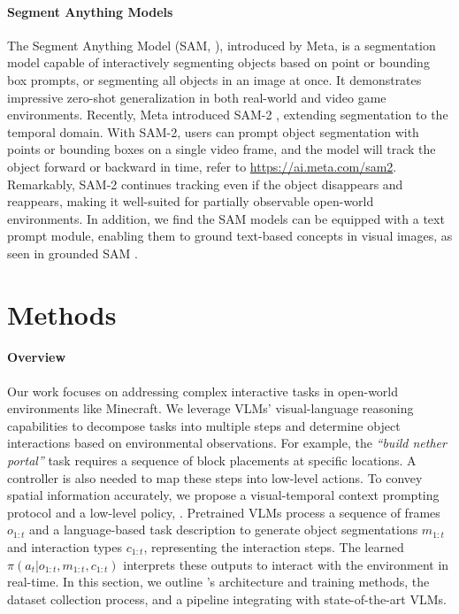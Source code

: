 \paragraph{Segment Anything Models} 
The Segment Anything Model (SAM, \cite{sam}), introduced by Meta, is a segmentation model capable of interactively segmenting objects based on point or bounding box prompts, or segmenting all objects in an image at once. It demonstrates impressive zero-shot generalization in both real-world and video game environments. Recently, Meta introduced SAM-2 \citep{sam2}, extending segmentation to the temporal domain. With SAM-2, users can prompt object segmentation with points or bounding boxes on a single video frame, and the model will track the object forward or backward in time, refer to \url{https://ai.meta.com/sam2}. Remarkably, SAM-2 continues tracking even if the object disappears and reappears, making it well-suited for partially observable open-world environments. In addition, we find the SAM models can be equipped with a text prompt module, enabling them to ground text-based concepts in visual images, as seen in grounded SAM \citep{liu2023grounding}. 



\section{Methods}
\label{sec:method}

\paragraph{Overview} Our work focuses on addressing complex interactive tasks in open-world environments like Minecraft. We leverage VLMs’ visual-language reasoning capabilities to decompose tasks into multiple steps and determine object interactions based on environmental observations. For example, the \textit{``build nether portal''} task requires a sequence of block placements at specific locations. A controller is also needed to map these steps into low-level actions. To convey spatial information accurately, we propose a visual-temporal context prompting protocol and a low-level policy, \agent. Pretrained VLMs process a sequence of frames $o_{1:t}$  and a language-based task description to generate object segmentations $m_{1:t}$  and interaction types $c_{1:t}$, representing the interaction steps. The learned \agent $\pi(a_t | o_{1:t}, m_{1:t}, c_{1:t})$ interprets these outputs to interact with the environment in real-time. In this section, we outline \agent’s architecture and training methods, the dataset collection process, and a pipeline integrating \agent with state-of-the-art VLMs. 

